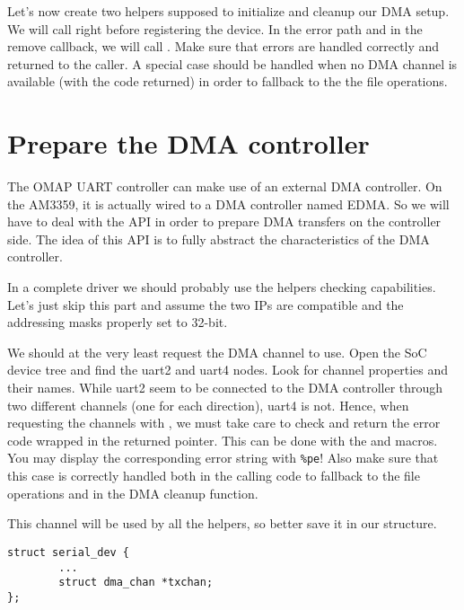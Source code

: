 Let's now create two helpers supposed to initialize and cleanup our DMA
setup. We will call  right before registering
the  device. In the  error path and in the
remove callback, we will call . Make sure that errors
are handled correctly and returned to the caller. A special case should be
handled when no DMA channel is available (with the  code returned)
in order to fallback to the the  file operations.

\section{Prepare the DMA controller}

The OMAP UART controller can make use of an external DMA controller. On
the AM3359, it is actually wired to a DMA controller named EDMA. So we
will have to deal with the  API in order to prepare DMA
transfers on the controller side. The idea of this API is to fully
abstract the characteristics of the DMA controller.

In a complete driver we should probably use the helpers checking
capabilities. Let's just skip this part and assume the two IPs are
compatible and the addressing masks properly set to 32-bit.

We should at the very least request the DMA channel to use. Open the SoC
device tree and find the uart2 and uart4 nodes. Look for 
channel properties and their names. While uart2 seem to be connected to
the DMA controller through two different channels (one for each
direction), uart4 is not. Hence, when requesting the channels with
, we must take care to check and return the error code
wrapped in the returned  pointer. This can be done with the
 and  macros. You may display the corresponding
error string with {\tt \%pe}! Also make sure that this case is correctly handled
both in the calling code to fallback to the  file
operations and in the DMA cleanup function.

This channel will be used by all the  helpers, so better
save it in our  structure.
\begin{verbatim}
struct serial_dev {
        ...
        struct dma_chan *txchan;
};
\end{verbatim}

